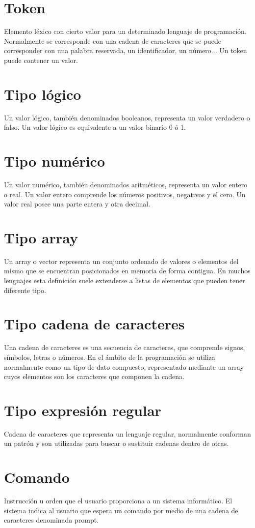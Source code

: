 \section{Token}
Elemento léxico con cierto valor para un determinado lenguaje de programación. Normalmente se corresponde con una cadena de
caracteres que se puede corresponder con una palabra reservada, un identificador, un número... Un token puede contener un 
valor.

\section {Tipo lógico}
Un valor lógico, también denominados booleanos, representa un valor verdadero o falso. Un valor lógico es equivalente a un valor binario 0 ó 1.

\section {Tipo numérico}
Un valor numérico, también denominados aritméticos, representa un valor entero o real. Un valor entero comprende los números positivos, negativos y el cero. Un valor real
posee una parte entera y otra decimal.

\section {Tipo array}
Un array o vector representa un conjunto ordenado de valores o elementos del mismo que se encuentran posicionados en memoria de forma contigua. En muchos lenguajes
esta definición suele extenderse a listas de elementos que pueden tener diferente tipo.

\section {Tipo cadena de caracteres}
Una cadena de caracteres es una secuencia de caracteres, que comprende signos, símbolos, letras o números. En el ámbito de la programación se utiliza normalmente como un tipo de 
dato compuesto, representado mediante un array cuyos elementos son los caracteres que componen la cadena.

\section {Tipo expresión regular}
Cadena de caracteres que representa un lenguaje regular, normalmente conforman un patrón y son utilizadas para buscar o 
sustituir cadenas dentro de otras. 

\section {Comando}
Instrucción u orden que el usuario proporciona a un sistema informático. El sistema indica al usuario que espera un comando por medio de una cadena de caracteres denominada prompt. 


